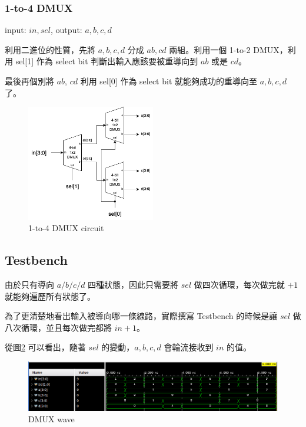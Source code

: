 \documentclass[10.5pt,compsoc,UTF8]{CjC}
\theoremstyle{mystyle}
\begin{document}
\subsubsection*{1-to-4 DMUX}

input: $in, sel$, output: $a, b, c, d$
\par

利用二進位的性質，先將 $a, b, c, d$ 分成 $ab, cd$ 兩組。利用一個 1-to-2 DMUX，利用 sel[1] 作為 select bit 判斷出輸入應該要被重導向到 $ab$ 或是 $cd$。
\par
最後再個別將 $ab$, $cd$ 利用 sel[0] 作為 select bit 就能夠成功的重導向至 $a, b, c, d$ 了。

\begin{figure}[h]
    \centering
    \includegraphics[width=0.5\textwidth]{1-to-4 DMUX.png}
      \caption{1-to-4 DMUX circuit}
    \label{fig:1-to-4-DMUX}
\end{figure}

\subsection{Testbench}
由於只有導向 $a / b / c / d$ 四種狀態，因此只需要將 $sel$ 做四次循環，每次做完就 $+1$ 就能夠遍歷所有狀態了。
\par
為了更清楚地看出輸入被導向哪一條線路，實際撰寫 Testbench 的時候是讓 $sel$ 做八次循環，並且每次做完都將 $in + 1$。
\par
從圖\ref{fig:DMUX_wave} 可以看出，隨著 $sel$ 的變動，$a, b, c, d$ 會輪流接收到 $in$ 的值。

\begin{figure}[h]
    \centering
    \includegraphics[width=\textwidth]{DMUX_wave.png}
      \caption{DMUX wave}
    \label{fig:DMUX_wave}
\end{figure}
\end{document}
